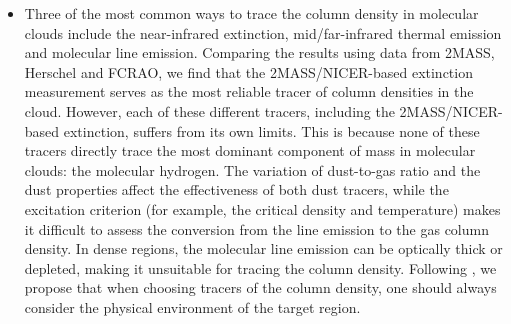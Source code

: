 \documentclass[11pt,a4paper]{emulateapj}
\begin{document}
\begin{itemize}
\item Three of the most common ways to trace the column density in molecular clouds include the near-infrared extinction, mid/far-infrared thermal emission and molecular line emission. Comparing the results using data from 2MASS, Herschel and FCRAO, we find that the 2MASS/NICER-based extinction measurement serves as the most reliable tracer of column densities in the cloud. However, each of these different tracers, including the 2MASS/NICER-based extinction, suffers from its own limits. This is because none of these tracers directly trace the most dominant component of mass in molecular clouds: the molecular hydrogen. The variation of dust-to-gas ratio and the dust properties affect the effectiveness of both dust tracers, while the excitation criterion (for example, the critical density and temperature) makes it difficult to assess the conversion from the line emission to the gas column density. In dense regions, the molecular line emission can be optically thick or depleted, making it unsuitable for tracing the column density. Following \citet{Goodman_2009}, we propose that when choosing tracers of the column density, one should always consider the physical environment of the target region. 

\end{itemize}
\end{document}
